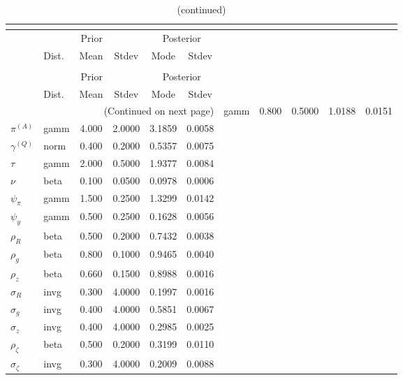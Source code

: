  
\begin{center}
\begin{longtable}{llcccc} 
\caption{Results from posterior maximization (parameters)}\\
 \label{Table:Posterior:1}\\
\toprule 
  & \multicolumn{3}{c}{Prior}  &  \multicolumn{2}{c}{Posterior} \\
  \cmidrule(r{.75em}){2-4} \cmidrule(r{.75em}){5-6}
  & Dist. & Mean  & Stdev & Mode & Stdev \\ 
\midrule \endfirsthead 
\caption{(continued)}\\
 \bottomrule 
  & \multicolumn{3}{c}{Prior}  &  \multicolumn{2}{c}{Posterior} \\
  \cmidrule(r{.75em}){2-4} \cmidrule(r{.75em}){5-6}
  & Dist. & Mean  & Stdev & Mode & Stdev \\ 
\midrule \endhead 
\bottomrule \multicolumn{6}{r}{(Continued on next page)}\endfoot 
\bottomrule\endlastfoot 
${r_{A}}$ & gamm &   0.800 & 0.5000 &   1.0188 &  0.0151 \\ 
${\pi^{(A)}}$ & gamm &   4.000 & 2.0000 &   3.1859 &  0.0058 \\ 
${\gamma^{(Q)}}$ & norm &   0.400 & 0.2000 &   0.5357 &  0.0075 \\ 
${\tau}$ & gamm &   2.000 & 0.5000 &   1.9377 &  0.0084 \\ 
${\nu}$ & beta &   0.100 & 0.0500 &   0.0978 &  0.0006 \\ 
${\psi_\pi}$ & gamm &   1.500 & 0.2500 &   1.3299 &  0.0142 \\ 
${\psi_y}$ & gamm &   0.500 & 0.2500 &   0.1628 &  0.0056 \\ 
${\rho_R}$ & beta &   0.500 & 0.2000 &   0.7432 &  0.0038 \\ 
${\rho_{g}}$ & beta &   0.800 & 0.1000 &   0.9465 &  0.0040 \\ 
${\rho_z}$ & beta &   0.660 & 0.1500 &   0.8988 &  0.0016 \\ 
${\sigma_R}$ & invg &   0.300 & 4.0000 &   0.1997 &  0.0016 \\ 
${\sigma_{g}}$ & invg &   0.400 & 4.0000 &   0.5851 &  0.0067 \\ 
${\sigma_z}$ & invg &   0.400 & 4.0000 &   0.2985 &  0.0025 \\ 
${\rho_\zeta}$ & beta &   0.500 & 0.2000 &   0.3199 &  0.0110 \\ 
${\sigma_\zeta}$ & invg &   0.300 & 4.0000 &   0.2009 &  0.0088 \\ 
\end{longtable}
 \end{center}
